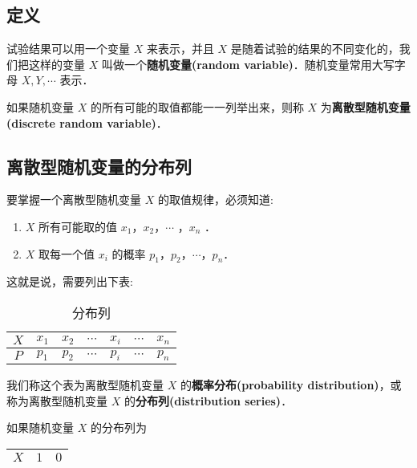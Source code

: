 
\subsection{定义}
试验结果可以用一个变量 $X$ 来表示，并且 $X$ 是随着试验的结果的不同变化的，我们把这样的变量 $X$ 叫做一个\textbf{随机变量(random variable)}．随机变量常用大写字母 $X,Y,\cdots$ 表示．

如果随机变量  $X$ 的所有可能的取值都能一一列举出来，则称 $X$ 为\textbf{离散型随机变量(discrete random variable)}．

\subsection{离散型随机变量的分布列}
要掌握一个离散型随机变量 $X$ 的取值规律，必须知道:
\begin{enumerate}
\item $X$ 所有可能取的值 $x_1$，$x_2$，$\cdots$ ，$x_n$ ．
\item $X$ 取每一个值 $x_i$ 的概率 $p_1$，$p_2$，$\cdots$，$p_n$．
\end{enumerate}
这就是说，需要列出下表:

\begin{table}[h]
\centering
\caption{分布列}\label{HsDRV_tab1}
\begin{tabular}{|c|c|c|c|c|c|c|}
\hline
$X$ & $x_1$ & $x_2$ & $\cdots$ & $x_i$ & $\cdots$ & $x_n$ \\
\hline
$P$ & $p_1$ & $p_2$ & $\cdots$ & $p_i$ & $\cdots$ & $p_n$ \\
\hline
\end{tabular}
\end{table}
我们称这个表为离散型随机变量 $X$ 的\textbf{概率分布(probability distribution)}，或称为离散型随机变量 $X$ 的\textbf{分布列(distribution series)}．

如果随机变量 $X$ 的分布列为

\begin{table}[h]
\centering
{}\label{HsDRV_tab2}
\begin{tabular}{|c|c|c|}
\hline
$X$ & $1$ & $0$ \\
\hline
\end{tabular}
\end{table}

